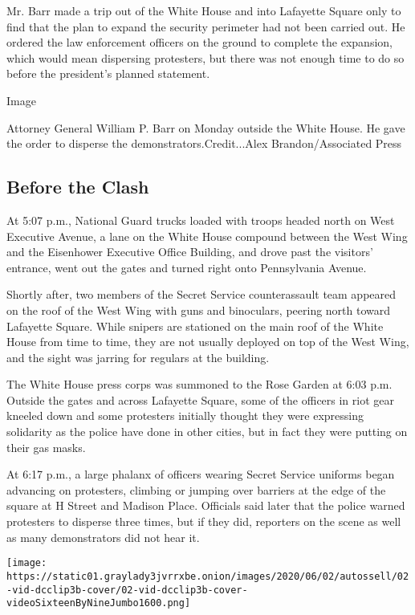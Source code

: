 Mr. Barr made a trip out of the White House and into Lafayette Square
only to find that the plan to expand the security perimeter had not been
carried out. He ordered the law enforcement officers on the ground to
complete the expansion, which would mean dispersing protesters, but
there was not enough time to do so before the president's planned
statement.

Image

Attorney General William P. Barr on Monday outside the White House. He
gave the order to disperse the demonstrators.Credit...Alex
Brandon/Associated Press

\hypertarget{before-the-clash}{%
\subsection{Before the Clash}\label{before-the-clash}}

At 5:07 p.m., National Guard trucks loaded with troops headed north on
West Executive Avenue, a lane on the White House compound between the
West Wing and the Eisenhower Executive Office Building, and drove past
the visitors' entrance, went out the gates and turned right onto
Pennsylvania Avenue.

Shortly after, two members of the Secret Service counterassault team
appeared on the roof of the West Wing with guns and binoculars, peering
north toward Lafayette Square. While snipers are stationed on the main
roof of the White House from time to time, they are not usually deployed
on top of the West Wing, and the sight was jarring for regulars at the
building.

The White House press corps was summoned to the Rose Garden at 6:03 p.m.
Outside the gates and across Lafayette Square, some of the officers in
riot gear kneeled down and some protesters initially thought they were
expressing solidarity as the police have done in other cities, but in
fact they were putting on their gas masks.

At 6:17 p.m., a large phalanx of officers wearing Secret Service
uniforms began advancing on protesters, climbing or jumping over
barriers at the edge of the square at H Street and Madison Place.
Officials said later that the police warned protesters to disperse three
times, but if they did, reporters on the scene as well as many
demonstrators did not hear it.

\texttt{[image: https://static01.graylady3jvrrxbe.onion/images/2020/06/02/autossell/02-vid-dcclip3b-cover/02-vid-dcclip3b-cover-videoSixteenByNineJumbo1600.png]}

